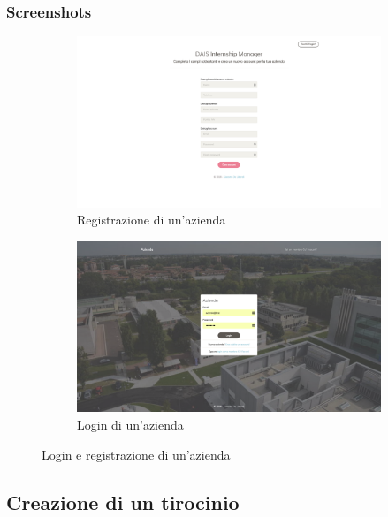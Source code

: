 \subsubsection{Screenshots}
\begin{figure}[H]
	\centering
	\begin{subfigure}[b]{1\textwidth}
		\includegraphics[width=\textwidth]{Chapter3/Figs/screenshots/register}
		\caption{Registrazione di un'azienda}
		\label{fig:screenshot:companyregister}
	\end{subfigure}
	\begin{subfigure}[b]{1\textwidth}
		\includegraphics[width=\textwidth]{Chapter3/Figs/screenshots/login}
		\caption{Login di un'azienda}
		\label{fig:screenshot:companylogin}   
	\end{subfigure}          
	\caption[Screenshot: login e registrazione di un'azienda]{Login e registrazione di un'azienda}
	\label{fig:screenshot:1}
\end{figure}

\pagebreak
\subsection{Creazione  di un tirocinio}\label{sec:creazione--di-un-tirocinio}


